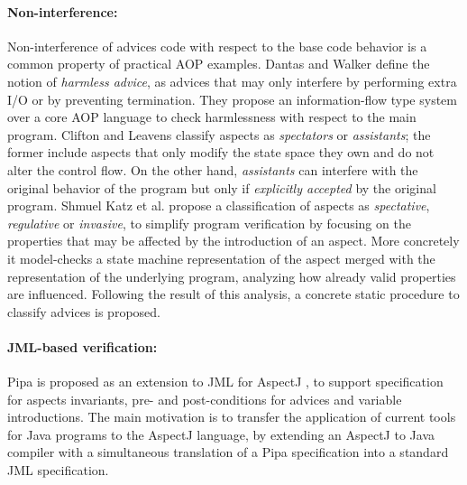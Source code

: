 \paragraph*{Non-interference:}
Non-interference of advices code with respect to the base code behavior is a
common property of practical AOP examples. 
Dantas and Walker \cite{DantasW06} define the notion of
\emph{harmless advice}, as advices that may only interfere by performing extra
I/O or by preventing termination.
They propose an information-flow type system over a core AOP language
\cite{WalkerZL03} to check harmlessness with respect to the main program.
Clifton and Leavens \cite{clifton02spectators} classify aspects as
\emph{spectators} or \emph{assistants}; the former include aspects that only
modify the state space they own and do not alter the control flow.
On the other hand, \emph{assistants} can interfere with the original behavior of
the program but only if \emph{explicitly accepted} by the original
program. 
Shmuel Katz et al. \cite{Katz06,GoldmanK06} propose a classification of
aspects as \emph{spectative}, \emph{regulative} or \emph{invasive}, to simplify
program verification by focusing on the properties that may be affected by the
introduction of an aspect. 
More concretely it model-checks a state machine representation of
the aspect merged with the representation of the underlying program,
analyzing how already valid properties are influenced.
Following the result of this analysis, a concrete static procedure to classify
advices is proposed. 

\paragraph*{JML-based verification:}
Pipa \cite{ZhaoR03} is proposed as an extension to JML
\cite{Leavens-etal07} for AspectJ \cite{AspectJ06}, 
to support specification for aspects invariants, pre- and post-conditions for
advices and variable introductions.
The main motivation is to transfer the application of current tools for Java
programs to the AspectJ language, by extending an AspectJ to Java compiler
with a simultaneous translation of a Pipa specification into a standard JML
specification.




